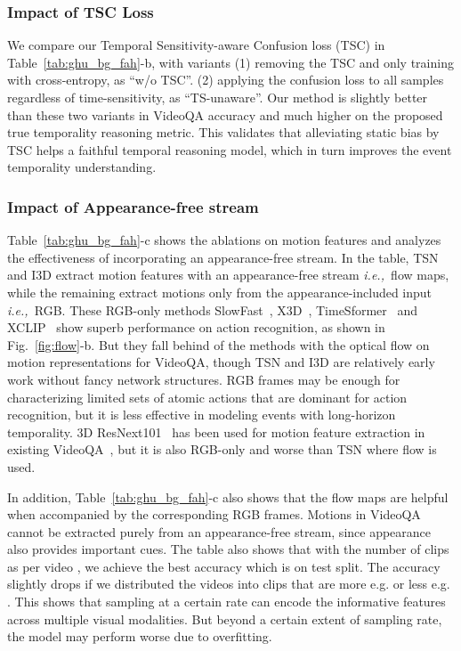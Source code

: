 \documentclass[sigconf]{acmart}
\newcommand{\ie}{\emph{i.e.,~}}
\begin{document}
\subsubsection{Impact of TSC Loss}
We compare our Temporal Sensitivity-aware Confusion loss (TSC) in Table~\ref{tab:ghu_bg_fah}-b, with variants (1) removing the TSC and only training with cross-entropy, as ``w/o TSC''. (2) applying the confusion loss to all samples regardless of time-sensitivity, as ``TS-unaware''. Our method is slightly better than these two variants in VideoQA accuracy and much higher on the proposed true temporality reasoning metric. This validates that alleviating static bias by TSC helps a faithful temporal reasoning model, which in turn improves the event temporality understanding.


\subsubsection{Impact of Appearance-free stream}
\label{sec:exp_accl}
Table~\ref{tab:ghu_bg_fah}-c shows the ablations on motion features  and analyzes the effectiveness of incorporating an appearance-free stream. 
In the table, TSN and I3D extract motion features with an appearance-free stream \ie flow maps, while the remaining extract motions only from the appearance-included input \ie RGB. These RGB-only methods SlowFast~\cite{feichtenhofer2019slowfast}, X3D~\cite{feichtenhofer2020x3d}, TimeSformer~\cite{bertasius2021space} and XCLIP~\cite{ni2022expanding} show superb performance on action recognition, as shown in Fig.~\ref{fig:flow}-b. But they fall behind of the methods with the optical flow on motion representations for VideoQA, though TSN and I3D are relatively early work without fancy network structures. 
RGB frames may be enough for characterizing limited sets of atomic actions that are dominant for action recognition, but it is less effective in modeling events with long-horizon temporality. 
3D ResNext101~\cite{hara3dcnns} has been used for motion feature extraction in existing VideoQA~\cite{le2020hierarchical, xiao2022hqga}, but it is also RGB-only and  worse than TSN where flow is used. 

In addition, Table~\ref{tab:ghu_bg_fah}-c also shows that the flow maps are helpful when accompanied by the corresponding RGB frames. Motions in VideoQA cannot be extracted purely from an appearance-free stream, since appearance also provides important cues. The table also shows that with the number of clips as per video , we achieve the best accuracy which is  on test split. The accuracy slightly drops if we distributed the videos into clips that are more e.g.  or less e.g. . This shows that sampling at a certain rate can encode the informative features across multiple visual modalities. But beyond a certain extent of sampling rate, the model may perform worse due to overfitting. 
\end{document}
